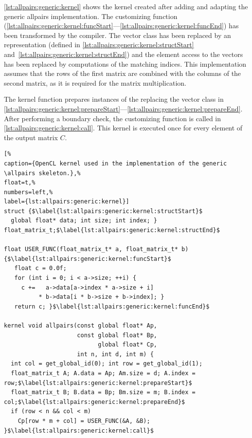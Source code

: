 \autoref{lst:allpairs:generic:kernel} shows the \OpenCL kernel created after adding and adapting the generic allpairs implementation.
The customizing function (\autoref{lst:allpairs:generic:kernel:funcStart}---\autoref{lst:allpairs:generic:kernel:funcEnd}) has been transformed by the  compiler.
The vector class has been replaced by an \OpenCL representation (defined in \autoref{lst:allpairs:generic:kernel:structStart} and~\ref{lst:allpairs:generic:kernel:structEnd}) and the element access to the vectors has been replaced by computations of the matching indices.
This implementation assumes that the rows of the first matrix are combined with the columns of the second matrix, as it is required for the matrix multiplication.

The  kernel function prepares instances of the  replacing the vector class in \autoref{lst:allpairs:generic:kernel:prepareStart}---\autoref{lst:allpairs:generic:kernel:prepareEnd}.
After performing a boundary check, the customizing function is called in \autoref{lst:allpairs:generic:kernel:call}.
This \OpenCL kernel is executed once for every element of the output matrix $C$.

\begin{lstlisting}[%
caption={OpenCL kernel used in the implementation of the generic \allpairs skeleton.},%
float=t,%
numbers=left,%
label={lst:allpairs:generic:kernel}]
struct {$\label{lst:allpairs:generic:kernel:structStart}$
  global float* data; int size; int index; } float_matrix_t;$\label{lst:allpairs:generic:kernel:structEnd}$

float USER_FUNC(float_matrix_t* a, float_matrix_t* b) {$\label{lst:allpairs:generic:kernel:funcStart}$
   float c = 0.0f;
   for (int i = 0; i < a->size; ++i) {
     c +=   a->data[a->index * a->size + i]
          * b->data[i * b->size + b->index]; }
   return c; }$\label{lst:allpairs:generic:kernel:funcEnd}$

kernel void allpairs(const global float* Ap,
                     const global float* Bp,
                           global float* Cp,
                     int n, int d, int m) {
  int col = get_global_id(0); int row = get_global_id(1);
  float_matrix_t A; A.data = Ap; Am.size = d; A.index = row;$\label{lst:allpairs:generic:kernel:prepareStart}$
  float_matrix_t B; B.data = Bp; Bm.size = m; B.index = col;$\label{lst:allpairs:generic:kernel:prepareEnd}$
  if (row < n && col < m)
    Cp[row * m + col] = USER_FUNC(&A, &B); }$\label{lst:allpairs:generic:kernel:call}$
\end{lstlisting}

